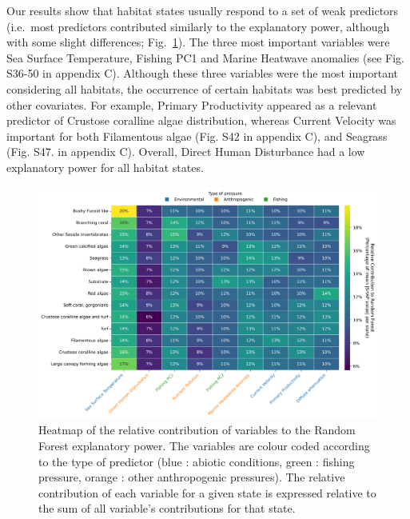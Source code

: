 \begin{refsection}
Our results show that habitat states usually respond to a set of weak
predictors (i.e.~most predictors contributed similarly to the
explanatory power, although with some slight differences;
Fig.~\ref{fig:chap3fig1}). The three most important variables were Sea
Surface Temperature, Fishing PC1 and Marine Heatwave anomalies (see Fig.
S36-50 in appendix C). Although these three variables were the most
important considering all habitats, the occurrence of certain habitats
was best predicted by other covariates. For example, Primary
Productivity appeared as a relevant predictor of Crustose coralline
algae distribution, whereas Current Velocity was important for both
Filamentous algae (Fig. S42 in appendix C), and Seagrass (Fig. S47. in
appendix C). Overall, Direct Human Disturbance had a low explanatory
power for all habitat states.

\newpage

\begin{figure}
\hypertarget{fig:chap3fig1}{%
\centering
\includegraphics{03-Chapitre3/figures/04-states_hab_shap_matrix_normalized.png}
\caption[Heatmap of the relative contribution of variables to the Random
Forest explanatory power.]{Heatmap of the relative contribution of variables to the Random
Forest explanatory power. The variables are colour coded according to
the type of predictor (blue : abiotic conditions, green : fishing
pressure, orange : other anthropogenic pressures). The relative
contribution of each variable for a given state is expressed relative to
the sum of all variable's contributions for that
state.}\label{fig:chap3fig1}
}
\end{figure}

\hypertarget{habitat-states-patterns}{%
}
\end{refsection}
